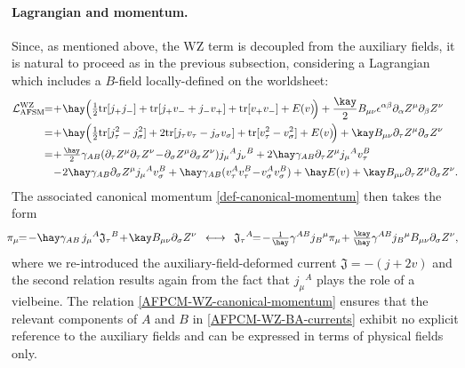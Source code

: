 \documentclass[12pt]{article}
\numberwithin{equation}{section}
\begin{document}
\paragraph{Lagrangian and momentum.} Since, as mentioned above, the WZ term is decoupled from the auxiliary fields, it is natural to proceed as in the previous subsection, considering a Lagrangian which includes a $B$-field locally-defined on the worldsheet:
\begin{align}
\mathcal{L}_{\mathrm{AFSM}}^{\text{WZ}}\!\!=\!&+\!\hay\Bigl(\tfrac{1}{2}\mathrm{tr}[j_{+}j_{-}]+\mathrm{tr}[j_{+}v_{-}+j_{-}v_{+}]+\mathrm{tr}[v_{+}v_{-}]+E(v) \!\Bigr)+\frac{\kay}{2}B_{\mu\nu} \epsilon^{\alpha\beta}\partial_{\alpha}Z^{\mu}\partial_{\beta}Z^{\nu}
\notag \\
=\!&+\!\hay\Bigl(\tfrac{1}{2}\mathrm{tr}[j_{\tau}^2-j_{\sigma}^2]+2\mathrm{tr}[j_{\tau}v_{\tau}-j_{\sigma}v_{\sigma}]+\mathrm{tr}[v_{\tau}^{2}-v_{\sigma}^{2}]+E(v)\!\Bigr)+\kay B_{\mu\nu}\partial_{\tau}Z^{\mu}\partial_{\sigma}Z^{\nu}
\notag \\
=\!&+\!\tfrac{\hay}{2}\gamma_{AB}(\partial_{\tau}Z^{\mu}\partial_{\tau}Z^{\nu}\!-\!\partial_{\sigma}Z^{\mu}\partial_{\sigma}Z^{\nu})j_{\mu}{}^{A}j_{\nu}{}^{B}+2\hay\gamma_{AB}\partial_{\tau}Z^{\mu}j_{\mu}{}^{A}v_{\tau}^{B}
\\
\!&-\!2\hay\gamma_{AB}\partial_{\sigma}Z^{\mu}j_{\mu}{}^{A}v_{\sigma}^{B}+\hay\gamma_{AB}(v_{\tau}^{A}v_{\tau}^{B}\!-\!v_{\sigma}^{A}v_{\sigma}^{B})+\hay E(v) +\kay B_{\mu\nu}\partial_{\tau}Z^{\mu}\partial_{\sigma}Z^{\nu}  .
\notag
\end{align}
The associated canonical momentum \eqref{def-canonical-momentum} then takes the form
\begin{equation}\label{AFPCM-WZ-canonical-momentum}
\!\!\!\pi_{\mu}\!\!=\! -\hay \gamma_{AB} \, j_{\mu}{}^{A}\mathfrak{J}_{\tau}{}^{B}\!+\!\kay B_{\mu\nu}\partial_{\sigma}Z^{\nu}
\,\,\, \longleftrightarrow \,\,\,  
\mathfrak{J}_{\tau}{}^{A}\!\!=\!-\tfrac{1}{\hay}\gamma^{AB}j_{B}{}^{\mu}\pi_{\mu}\!+\tfrac{\kay}{\hay}\gamma^{AB}j_{B}{}^{\mu}B_{\mu\nu}\partial_{\sigma}Z^{\nu}  ,
\end{equation}
where we re-introduced the auxiliary-field-deformed current $\mathfrak{J}=-(j+2v)$ and the second relation results again from the fact that $j_{\mu}{}^{A}$ plays the role of a vielbeine. The relation \eqref{AFPCM-WZ-canonical-momentum} ensures that the relevant components of $A$ and $B$ in \eqref{AFPCM-WZ-BA-currents} exhibit no explicit reference to the auxiliary fields and can be expressed in terms of physical fields only.
\end{document}
